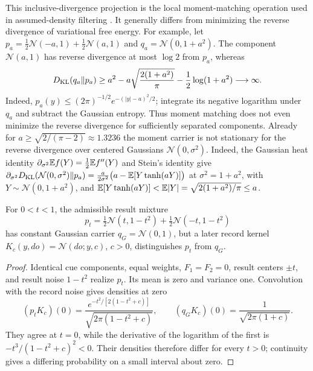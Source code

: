 This inclusive-divergence projection is the local moment-matching operation used in assumed-density filtering \citep{Minka2001EP}. It generally differs from minimizing the reverse divergence of variational free energy. For example, let $p_a=\tfrac12\mathcal N(-a,1)+\tfrac12\mathcal N(a,1)$ and $q_a=\mathcal N(0,1+a^2)$. The component $\mathcal N(a,1)$ has reverse divergence at most $\log2$ from $p_a$, whereas
\begin{equation}
 D_{\mathrm{KL}}(q_a\Vert p_a)
 \ge a^2-a\sqrt{\frac{2(1+a^2)}{\pi}}-\frac12\log(1+a^2)
 \longrightarrow\infty.
 \label{cmem:reverse-counterexample}
\end{equation}
Indeed, $p_a(y)\le(2\pi)^{-1/2}e^{-(|y|-a)^2/2}$; integrate its negative logarithm under $q_a$ and subtract the Gaussian entropy. Thus moment matching does not even minimize the reverse divergence for sufficiently separated components. Already for $a\geq\sqrt{2/(\pi-2)}\approx1.3236$ the moment carrier is not stationary for the reverse divergence over centered Gaussians $\mathcal N(0,\sigma^2)$. Indeed, the Gaussian heat identity $\partial_{\sigma^2}\mathbb E f(Y)=\tfrac12\mathbb E f''(Y)$ and Stein's identity give $\partial_{\sigma^2}D_{\mathrm{KL}}(\mathcal N(0,\sigma^2)\Vert p_a)=\frac a{2\sigma^2}\bigl(a-\mathbb E[Y\tanh(aY)]\bigr)$ at $\sigma^2=1+a^2$, with $Y\sim\mathcal N(0,1+a^2)$, and $\mathbb E[Y\tanh(aY)]<\mathbb E|Y|=\sqrt{2(1+a^2)/\pi}\leq a$.

For $0<t<1$, the admissible result mixture
\begin{equation}
 p_t=\tfrac12\mathcal N(t,1-t^2)+\tfrac12\mathcal N(-t,1-t^2)
 \label{cmem:constant-moments}
\end{equation}
has constant Gaussian carrier $q_G=\mathcal N(0,1)$, but a later record kernel $K_c(y,do)=\mathcal N(do;y,c)$, $c>0$, distinguishes $p_t$ from $q_G$.
\begin{proof}
Identical cue components, equal weights, $F_1=F_2=0$, result centers $\pm t$, and result noise $1-t^2$ realize $p_t$. Its mean is zero and variance one. Convolution with the record noise gives densities at zero
\begin{equation}
 (p_tK_c)(0)=\frac{e^{-t^2/[2(1-t^2+c)]}}{\sqrt{2\pi(1-t^2+c)}},\qquad
 (q_GK_c)(0)=\frac1{\sqrt{2\pi(1+c)}}.
\end{equation}
They agree at $t=0$, while the derivative of the logarithm of the first is $-t^3/(1-t^2+c)^2<0$. Their densities therefore differ for every $t>0$; continuity gives a differing probability on a small interval about zero.
\end{proof}

